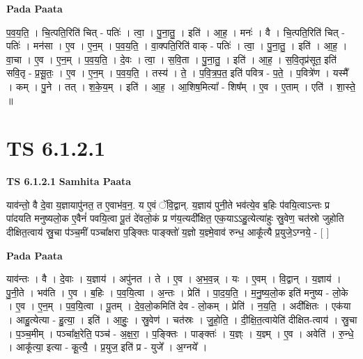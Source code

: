 \documentclass[17pt]{extarticle}
\begin{document}
\textbf{Pada Paata} \newline

प॒व॒य॒ति॒ । चि॒त्पति॒रिति॑ चित् - पतिः॑ । त्वा॒ । पु॒ना॒तु॒ । इति॑ । आ॒ह॒ । मनः॑ । वै । चि॒त्पति॒रिति॑ चित् - पतिः॑ । मन॑सा । ए॒व । ए॒न॒म् । प॒व॒य॒ति॒ । वा॒क्पति॒रिति॑ वाक् - पतिः॑ । त्वा॒ । पु॒ना॒तु॒ । इति॑ । आ॒ह॒ । वा॒चा । ए॒व । ए॒न॒म् । प॒व॒य॒ति॒ । दे॒वः । त्वा॒ । स॒वि॒ता । पु॒ना॒तु॒ । इति॑ । आ॒ह॒ । स॒वि॒तृप्र॑सूत॒ इति॑ सवि॒तृ - प्र॒सू॒तः॒ । ए॒व । ए॒न॒म् । प॒व॒य॒ति॒ । तस्य॑ । ते॒ । प॒वि॒त्र॒प॒त॒ इति॑ पवित्र - प॒ते॒ । प॒वित्रे॑ण । यस्मै᳚ । कम् । पु॒ने । तत् । श॒के॒य॒म् । इति॑ । आ॒ह॒ । आ॒शिष॒मित्या᳚ - शिष᳚म् । ए॒व । ए॒ताम् । एति॑ । शा॒स्ते॒ ॥  \newline




\section*{ TS 6.1.2.1 }

\textbf{TS 6.1.2.1 } \newline
\textbf{Samhita Paata} \newline

याव॑न्तो॒ वै दे॒वा य॒ज्ञायापु॑नत॒ त ए॒वाभ॑व॒न॒. य ए॒वं ॅवि॒द्वान्. य॒ज्ञाय॑ पुनी॒ते भव॑त्ये॒व ब॒हिः प॑वयि॒त्वाऽन्तः प्र पा॑दयति मनुष्यलो॒क ए॒वैनं॑ पवयि॒त्वा पू॒तं दे॑वलो॒कं प्र ण॑य॒त्यदी᳚क्षित॒ एक॒याऽऽहु॒त्येत्या॑हुः स्रु॒वेण॒ चत॑स्रो जुहोति दीक्षित॒त्वाय॑ स्रु॒चा प॑ञ्च॒मीं पञ्चा᳚क्षरा प॒ङ्क्तिः पाङ्क्तो॑ य॒ज्ञो य॒ज्ञ्मे॒वाव॑ रुन्ध॒ आकू᳚त्यै प्र॒युजे॒ऽग्नये॒ - [  ] \newline

\textbf{Pada Paata} \newline

याव॑न्तः । वै । दे॒वाः । य॒ज्ञाय॑ । अपु॑नत । ते । ए॒व । अ॒भ॒व॒न्न् । यः । ए॒वम् । वि॒द्वान् । य॒ज्ञाय॑ । पु॒नी॒ते । भव॑ति । ए॒व । ब॒हिः । प॒व॒यि॒त्वा । अ॒न्तः । प्रेति॑ । पा॒द॒य॒ति॒ । म॒नु॒ष्य॒लो॒क इति॑ मनुष्य - लो॒के । ए॒व । ए॒न॒म् । प॒व॒यि॒त्वा । पू॒तम् । दे॒व॒लो॒कमिति॑ देव - लो॒कम् । प्रेति॑ । न॒य॒ति॒ । अदी᳚क्षितः । एक॑या । आहु॒त्येत्या - हु॒त्या॒ । इति॑ । आ॒हुः॒ । स्रु॒वेण॑ । चत॑स्रः । जु॒हो॒ति॒ । दी॒क्षि॒त॒त्वायेति॑ दीक्षित-त्वाय॑ । स्रु॒चा । प॒ञ्च॒मीम् । पञ्चा᳚क्ष॒रेति॒ पञ्च॑ - अ॒क्ष॒रा॒ । प॒ङ्क्तिः । पाङ्क्तः॑ । य॒ज्ञ्ः । य॒ज्ञ्म् । ए॒व । अवेति॑ । रु॒न्धे॒ । आकू᳚त्या॒ इत्या - कू॒त्यै॒ । प्र॒युज॒ इति॑ प्र - युजे᳚ । अ॒ग्नये᳚ ।  \newline
\end{document}
